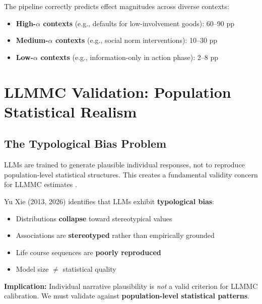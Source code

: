 The pipeline correctly predicts effect magnitudes across diverse contexts:
\begin{itemize}[nosep]
\item \textbf{High-$\alpha$ contexts} (e.g., defaults for low-involvement goods): 60--90 pp
\item \textbf{Medium-$\alpha$ contexts} (e.g., social norm interventions): 10--30 pp
\item \textbf{Low-$\alpha$ contexts} (e.g., information-only in action phase): 2--8 pp
\end{itemize}



\section{LLMMC Validation: Population Statistical Realism}
\label{sec:iii-validation-psr}

\subsection{The Typological Bias Problem}

LLMs are trained to generate plausible individual responses, not to reproduce
population-level statistical structures. This creates a fundamental validity concern
for LLMMC estimates \citep{xie2013population}.

\begin{tcolorbox}[colback=red!5!white, colframe=red!75!black,
    title=Warning: Typological Bias in LLMs]
Yu Xie (2013, 2026) identifies that LLMs exhibit \textbf{typological bias}:
\begin{itemize}[nosep]
\item Distributions \textbf{collapse} toward stereotypical values
\item Associations are \textbf{stereotyped} rather than empirically grounded
\item Life course sequences are \textbf{poorly reproduced}
\item Model size $\neq$ statistical quality
\end{itemize}

\textbf{Implication:} Individual narrative plausibility is \emph{not} a valid criterion
for LLMMC calibration. We must validate against \textbf{population-level statistical patterns}.
\end{tcolorbox}

